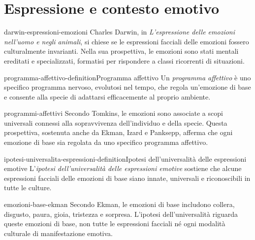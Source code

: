 \documentclass[preview]{standalone}
\begin{document}
\genpage

\section{Espressione e contesto emotivo}

\begin{snippet}{darwin-espressioni-emozioni}
    Charles Darwin, in \emph{L'espressione delle emozioni nell'uomo e negli
    animali}, si chiese se le espressioni facciali delle emozioni fossero
    culturalmente invarianti. Nella sua prospettiva, le emozioni sono stati
    mentali ereditati e specializzati, formatisi per rispondere a classi
    ricorrenti di situazioni.
\end{snippet}

\begin{snippetdefinition}{programma-affettivo-definition}{Programma affettivo}
    Un \emph{programma affettivo} è uno specifico programma nervoso, evolutosi
    nel tempo, che regola un'emozione di base e consente alla specie di
    adattarsi efficacemente al proprio ambiente.
\end{snippetdefinition}

\begin{snippet}{programmi-affettivi}
    Secondo Tomkins, le emozioni sono associate a scopi universali connessi alla
    sopravvivenza dell'individuo e della specie. Questa prospettiva, sostenuta
    anche da Ekman, Izard e Panksepp, afferma che ogni emozione di base sia
    regolata da uno specifico programma affettivo.
\end{snippet}

\begin{snippetdefinition}{ipotesi-universalita-espressioni-definition}{Ipotesi dell'universalità delle espressioni emotive}
    L'\emph{ipotesi dell'universalità delle espressioni emotive} sostiene che
    alcune espressioni facciali delle emozioni di base siano innate, universali
    e riconoscibili in tutte le culture.
\end{snippetdefinition}

\begin{snippet}{emozioni-base-ekman}
    Secondo Ekman, le emozioni di base includono collera, disgusto, paura,
    gioia, tristezza e sorpresa. L'ipotesi dell'universalità riguarda queste
    emozioni di base, non tutte le espressioni facciali né ogni modalità
    culturale di manifestazione emotiva.
\end{snippet}
\end{document}
